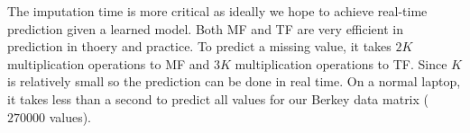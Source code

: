 The imputation time is more critical as ideally we hope to achieve real-time prediction given a learned model. 
Both MF and TF are very efficient in prediction in thoery and practice.
To predict a missing value, it takes $2K$ multiplication operations to MF and $3K$ multiplication operations to TF.
Since $K$ is relatively small so the prediction can be done in real time.
On a normal laptop, it takes less than a second to predict all values for our Berkey data matrix ($270000$ values).

